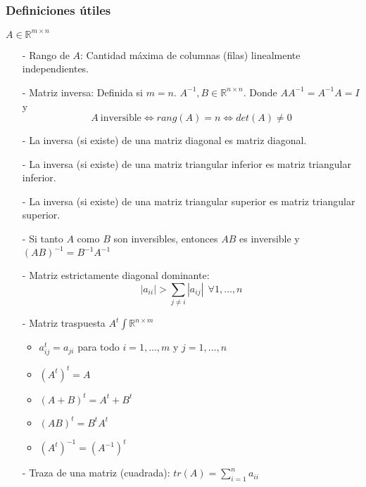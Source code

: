 \subsubsection{Definiciones útiles}\label{subsubsec:definiciones_utiles_matrices}

$A \in \mathbb{R}^{m \times n}$

\begin{itemize}
    \item[-] Rango de $A$: Cantidad máxima de columnas (filas) linealmente independientes.
    \item[-] Matriz inversa: Definida si $m = n$. $A^{-1}, B \in \mathbb{R}^{n \times n}$. Donde $AA^{-1} = A^{-1}A = I$ y 
     \[A ~\text{inversible} \iff rang(A) = n \iff det(A) \neq 0\]
    \item[-] La inversa (si existe) de una matriz diagonal es matriz diagonal.
    \item[-] La inversa (si existe) de una matriz triangular inferior es matriz triangular inferior.
    \item[-] La inversa (si existe) de una matriz triangular superior es matriz triangular superior.
    \item[-] Si tanto $A$ como  $B$ son inversibles, entonces $AB$ es inversible y ${(AB)}^{-1} = B^{-1}A^{-1}$
    \item[-] Matriz estrictamente diagonal dominante:
    \[|a_{ii}| >  \sum_{j\neq i}|a_{ij}| ~~\forall 1,\ldots,n\]
    \item[-] Matriz traspuesta $A^{t} \int \mathbb{R}^{n \times m}$
    \begin{itemize}
        \item $a_{ij}^{t} = a_{ji}$ para todo $i = 1,\ldots,m$ y $j = 1,\ldots,n$
        \item ${(A^{t})}^{t} = A$
        \item ${(A + B)}^{t} = A^{t} + B^{t}$
        \item ${(AB)}^{t} = B^{t}A^{t}$
        \item ${(A^{t})}^{-1} = {(A^{-1})}^{t}$
    \end{itemize}
    \item[-] Traza de una matriz (cuadrada): $tr(A) = \sum_{i=1}^{n} a_{ii}$
    

\end{itemize}
